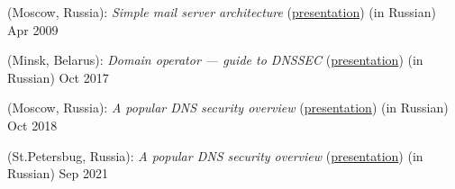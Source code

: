  (Moscow, Russia): \textit{Simple mail server architecture} (\href{https://www.slideshare.net/Dolce727/ss-1278915}{presentation}) (in Russian) \hfill Apr 2009

%
 (Minsk, Belarus): \textit{Domain operator --- guide to DNSSEC} (\href{https://www.slideshare.net/schors/enog14-dnssec}{presentation}) (in Russian) \hfill Oct 2017

 (Moscow, Russia): \textit{A popular DNS security overview} (\href{https://www.slideshare.net/schors/a-popular-dns-security-overview-modern-theory-and-practice-116166410}{presentation}) (in Russian) \hfill Oct 2018

%
%
 (St.Petersbug, Russia): \textit{A popular DNS security overview} (\href{https://www.slideshare.net/schors/a-popular-dns-security-overview}{presentation}) (in Russian) \hfill Sep 2021
